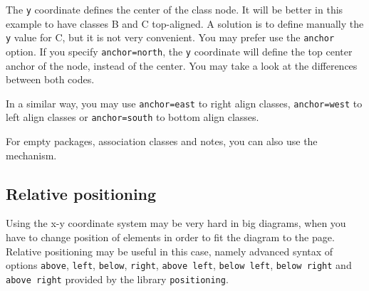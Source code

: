 \documentclass[a4paper,11pt]{report}
\begin{document}
\medskip

\begin{minipage}{0.5\textwidth}
	
\end{minipage}
\begin{minipage}{0.5\textwidth}
	\begin{center}
	\end{center}
\end{minipage}

\medskip

The {\tt y} coordinate defines the center of the class node. It will be better in this example to have classes B and C top-aligned. A solution is to define manually the {\tt y} value for C, but it is not very convenient. You may prefer use the {\tt anchor} option. If you specify {\tt anchor=north}, the {\tt y} coordinate will define the top center anchor of the node, instead of the center. You may take a look at the differences between both codes.

\medskip

\begin{minipage}{0.5\textwidth}
	
\end{minipage}
\begin{minipage}{0.5\textwidth}
	\begin{center}
	\end{center}
\end{minipage}

\medskip

In a similar way, you may use {\tt anchor=east} to right align classes, {\tt anchor=west} to left align classes or {\tt anchor=south} to bottom align classes.

\medskip

For empty packages, association classes and notes, you can also use the mechanism.

\subsection{Relative positioning}\label{ss.relpos}

Using the x-y coordinate system may be very hard in big diagrams, when you have to change position of elements in order to fit the diagram to the page. Relative positioning may be useful in this case, namely advanced syntax of options {\tt above}, {\tt left}, {\tt below}, {\tt right}, {\tt above left}, {\tt below left}, {\tt below right} and {\tt above right} provided by the \TikZ library {\tt positioning}.
\end{document}
